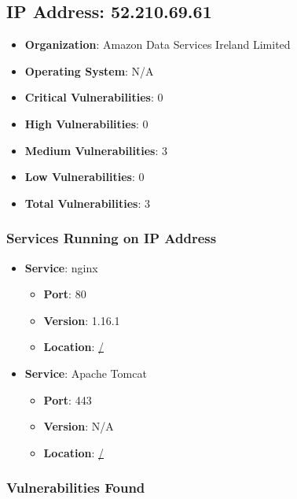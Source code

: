\documentclass{article}
\begin{document}
\clearpage



\subsection*{IP Address: 52.210.69.61}

\begin{itemize}
    \item \textbf{Organization}: Amazon Data Services Ireland Limited
    \item \textbf{Operating System}:  N/A 
    \item \textbf{Critical Vulnerabilities}: 0
    \item \textbf{High Vulnerabilities}: 0
    \item \textbf{Medium Vulnerabilities}: 3
    \item \textbf{Low Vulnerabilities}: 0
    \item \textbf{Total Vulnerabilities}: 3
\end{itemize}

\subsubsection*{Services Running on IP Address}

\begin{itemize}
    
        \item \textbf{Service}: nginx
        \begin{itemize}
            \item \textbf{Port}: 80
            \item \textbf{Version}:  1.16.1 
            \item \textbf{Location}: \href{ / }{ / }
        \end{itemize}
    
        \item \textbf{Service}: Apache Tomcat
        \begin{itemize}
            \item \textbf{Port}: 443
            \item \textbf{Version}:  N/A 
            \item \textbf{Location}: \href{ / }{ / }
        \end{itemize}
    
\end{itemize}


\subsubsection*{Vulnerabilities Found}
\end{document}
